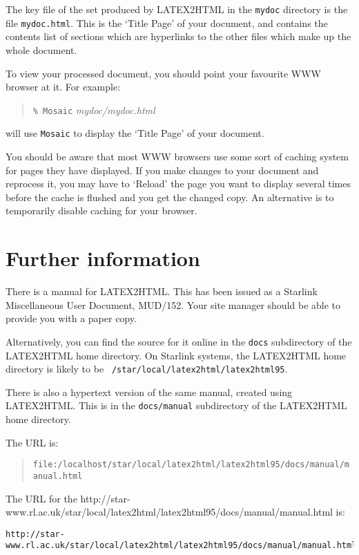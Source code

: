 The key file of the set produced by LATEX2HTML in the {\tt mydoc}
directory is the file {\tt mydoc.html}.  This is the `Title Page' of
your document, and contains the contents list of sections which are
hyperlinks to the other files which make up the whole document.

To view your processed document, you should point your favourite WWW
browser at it.  For example:

\begin{quote}
{\tt \% Mosaic} {\it mydoc/mydoc.html}
\end{quote}

will use {\tt Mosaic} to display the `Title Page' of your document.

You should be aware that most WWW browsers use some sort of caching
system for pages they have displayed.  If you make changes to your
document and reprocess it, you may have to `Reload' the page you want to
display several times before the cache is flushed and you get the
changed copy.  An alternative is to temporarily disable caching for
your browser.

\section{Further information}

There is a manual for LATEX2HTML.  This has been issued as a Starlink
Miscellaneous User Document, MUD/152.  Your site manager should be able
to provide you with a paper copy.  

Alternatively, you can find the source for it online in the {\tt docs}
subdirectory of the LATEX2HTML home directory.  On Starlink systems,
the LATEX2HTML home directory is likely to be {\tt
/star/\-local/latex2html/latex2html95}.

There is also a hypertext version of the same manual, created using
LATEX2HTML.  This is in the {\tt docs/manual} subdirectory of the
LATEX2HTML home directory.  

The URL is:

\begin{quote}
{\small
{\tt file:/localhost/star/local/latex2html/latex2html95/docs/manual/manual.html}
}
\end{quote}

The URL for the
{http://star-www.rl.ac.uk/star/local/latex2html/latex2html95/docs/manual/manual.html}
is:

{\small
\begin{verbatim}
http://star-www.rl.ac.uk/star/local/latex2html/latex2html95/docs/manual/manual.html
\end{verbatim}
}


